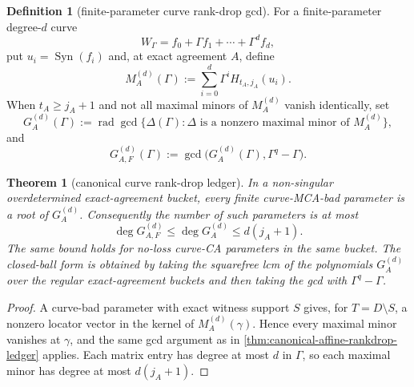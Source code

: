 \documentclass[11pt]{article}
\newtheorem{theorem}{Theorem}[section]
\theoremstyle{definition}
\newtheorem{definition}[definition]{Definition}
\theoremstyle{remark}
\newcommand{\Syn}{\operatorname{Syn}}
\begin{document}
\begin{definition}[finite-parameter curve rank-drop gcd]
\label{def:curve-rankdrop-gcd}
For a finite-parameter degree-$d$ curve
\[
        W_\Gamma=f_0+\Gamma f_1+\cdots+\Gamma^d f_d,
\]
put $u_i=\Syn(f_i)$ and, at exact agreement $A$, define
\[
        M_A^{(d)}(\Gamma):=
        \sum_{i=0}^{d}\Gamma^i H_{t_A,j_A}(u_i).
\]
When $t_A\ge j_A+1$ and not all maximal minors of $M_A^{(d)}$ vanish
identically, set
\[
        G_A^{(d)}(\Gamma)
        :=\operatorname{rad}\gcd\{\Delta(\Gamma):
              \Delta\text{ is a nonzero maximal minor of }M_A^{(d)}\},
\]
and
\[
        G_{A,F}^{(d)}(\Gamma):=
        \gcd\bigl(G_A^{(d)}(\Gamma),\Gamma^q-\Gamma\bigr).
\]
\end{definition}

\begin{theorem}[canonical curve rank-drop ledger]
\label{thm:canonical-curve-rankdrop-ledger}
In a non-singular overdetermined exact-agreement bucket, every finite
curve-MCA-bad parameter is a root of $G_A^{(d)}$.  Consequently the number of
such parameters is at most
\[
        \deg G_{A,F}^{(d)}
        \le \deg G_A^{(d)}
        \le d(j_A+1).
\]
The same bound holds for no-loss curve-CA parameters in the same bucket.  The
closed-ball form is obtained by taking the squarefree lcm of the polynomials
$G_A^{(d)}$ over the regular exact-agreement buckets and then taking the gcd with
$\Gamma^q-\Gamma$.
\end{theorem}

\begin{proof}
A curve-bad parameter with exact witness support $S$ gives, for
$T=D\setminus S$, a nonzero locator vector in the kernel of
$M_A^{(d)}(\gamma)$.  Hence every maximal minor vanishes at $\gamma$, and the
same gcd argument as in \cref{thm:canonical-affine-rankdrop-ledger} applies.
Each matrix entry has degree at most $d$ in $\Gamma$, so each maximal minor has
degree at most $d(j_A+1)$.
\end{proof}
\end{document}
